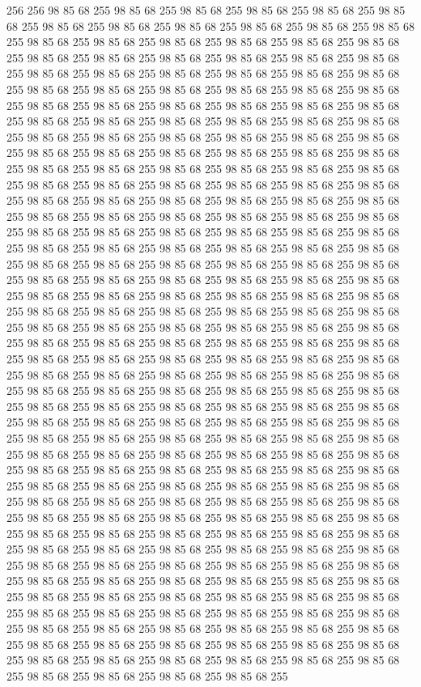 256 256 98 85 68 255 98 85 68 255 98 85 68 255 98 85 68 255 98 85 68 255 98 85 68 255 98 85 68 255 98 85 68 255 98 85 68 255 98 85 68 255 98 85 68 255 98 85 68 255 98 85 68 255 98 85 68 255 98 85 68 255 98 85 68 255 98 85 68 255 98 85 68 255 98 85 68 255 98 85 68 255 98 85 68 255 98 85 68 255 98 85 68 255 98 85 68 255 98 85 68 255 98 85 68 255 98 85 68 255 98 85 68 255 98 85 68 255 98 85 68 255 98 85 68 255 98 85 68 255 98 85 68 255 98 85 68 255 98 85 68 255 98 85 68 255 98 85 68 255 98 85 68 255 98 85 68 255 98 85 68 255 98 85 68 255 98 85 68 255 98 85 68 255 98 85 68 255 98 85 68 255 98 85 68 255 98 85 68 255 98 85 68 255 98 85 68 255 98 85 68 255 98 85 68 255 98 85 68 255 98 85 68 255 98 85 68 255 98 85 68 255 98 85 68 255 98 85 68 255 98 85 68 255 98 85 68 255 98 85 68 255 98 85 68 255 98 85 68 255 98 85 68 255 98 85 68 255
98 85 68 255 98 85 68 255 98 85 68 255 98 85 68 255 98 85 68 255 98 85 68 255 98 85 68 255 98 85 68 255 98 85 68 255 98 85 68 255 98 85 68 255 98 85 68 255 98 85 68 255 98 85 68 255 98 85 68 255 98 85 68 255 98 85 68 255 98 85 68 255 98 85 68 255 98 85 68 255 98 85 68 255 98 85 68 255 98 85 68 255 98 85 68 255 98 85 68 255 98 85 68 255 98 85 68 255 98 85 68 255 98 85 68 255 98 85 68 255 98 85 68 255 98 85 68 255 98 85 68 255 98 85 68 255 98 85 68 255 98 85 68 255 98 85 68 255 98 85 68 255 98 85 68 255 98 85 68 255 98 85 68 255 98 85 68 255 98 85 68 255 98 85 68 255 98 85 68 255 98 85 68 255 98 85 68 255 98 85 68 255 98 85 68 255 98 85 68 255 98 85 68 255 98 85 68 255 98 85 68 255 98 85 68 255 98 85 68 255 98 85 68 255 98 85 68 255 98 85 68 255 98 85 68 255 98 85 68 255 98 85 68 255 98 85 68 255 98 85 68 255 98 85 68 255
98 85 68 255 98 85 68 255 98 85 68 255 98 85 68 255 98 85 68 255 98 85 68 255 98 85 68 255 98 85 68 255 98 85 68 255 98 85 68 255 98 85 68 255 98 85 68 255 98 85 68 255 98 85 68 255 98 85 68 255 98 85 68 255 98 85 68 255 98 85 68 255 98 85 68 255 98 85 68 255 98 85 68 255 98 85 68 255 98 85 68 255 98 85 68 255 98 85 68 255 98 85 68 255 98 85 68 255 98 85 68 255 98 85 68 255 98 85 68 255 98 85 68 255 98 85 68 255 98 85 68 255 98 85 68 255 98 85 68 255 98 85 68 255 98 85 68 255 98 85 68 255 98 85 68 255 98 85 68 255 98 85 68 255 98 85 68 255 98 85 68 255 98 85 68 255 98 85 68 255 98 85 68 255 98 85 68 255 98 85 68 255 98 85 68 255 98 85 68 255 98 85 68 255 98 85 68 255 98 85 68 255 98 85 68 255 98 85 68 255 98 85 68 255 98 85 68 255 98 85 68 255 98 85 68 255 98 85 68 255 98 85 68 255 98 85 68 255 98 85 68 255 98 85 68 255
98 85 68 255 98 85 68 255 98 85 68 255 98 85 68 255 98 85 68 255 98 85 68 255 98 85 68 255 98 85 68 255 98 85 68 255 98 85 68 255 98 85 68 255 98 85 68 255 98 85 68 255 98 85 68 255 98 85 68 255 98 85 68 255 98 85 68 255 98 85 68 255 98 85 68 255 98 85 68 255 98 85 68 255 98 85 68 255 98 85 68 255 98 85 68 255 98 85 68 255 98 85 68 255 98 85 68 255 98 85 68 255 98 85 68 255 98 85 68 255 98 85 68 255 98 85 68 255 98 85 68 255 98 85 68 255 98 85 68 255 98 85 68 255 98 85 68 255 98 85 68 255 98 85 68 255 98 85 68 255 98 85 68 255 98 85 68 255 98 85 68 255 98 85 68 255 98 85 68 255 98 85 68 255 98 85 68 255 98 85 68 255 98 85 68 255 98 85 68 255 98 85 68 255 98 85 68 255 98 85 68 255 98 85 68 255 98 85 68 255 98 85 68 255 98 85 68 255 98 85 68 255 98 85 68 255 98 85 68 255 98 85 68 255 98 85 68 255 98 85 68 255 98 85 68 255
